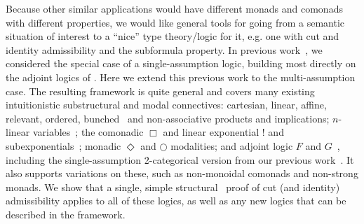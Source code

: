 Because other similar applications would have different monads and
comonads with different properties, we would like general tools for
going from a semantic situation of interest to a ``nice'' type
theory/logic for it, e.g. one with cut and identity admissibility and
the subformula property. In previous work~\citep{ls16adjoint}, we
considered the special case of a single-assumption logic, building most
directly on the adjoint logics of
\citet{benton94mixed,bentonwadler96adjoint,reed09adjoint}.  Here we
extend this previous work to the multi-assumption case.  The resulting
framework is quite general and covers many existing intuitionistic
substructural and modal connectives: cartesian, linear, affine,
relevant, ordered, bunched~\citep{ohearnpym99bunched} and
non-associative products and implications; $n$-linear
variables~\citep{reed08namessubstructural}; the comonadic $\Box$ and
linear exponential $!$ and
subexponentials~\citep{nigammiller09subexponentials,danos+93subexponentials};
monadic $\Diamond$ and $\bigcirc$ modalities; and adjoint logic $F$ and
$G$~\citep{benton94mixed,bentonwadler96adjoint,reed09adjoint}, including
the single-assumption 2-categorical version from our previous
work~\citep{ls16adjoint}.  It also supports variations on these, such as
non-monoidal comonads and non-strong monads.  We show that a single,
simple structural~\citep{pfenning94cut} proof of cut (and identity)
admissibility applies to all of these logics, as well as any new logics
that can be described in the framework.

